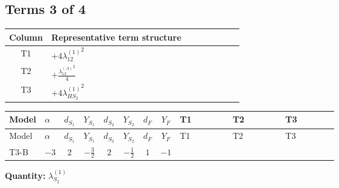 \documentclass[8pt]{article}
\begin{document}
\begin{landscape}
\subsection*{Terms 3 of 4}
\begin{center}
\begin{tabular}{@{}c >{\raggedright\arraybackslash}p{0.82\linewidth}@{}}
\toprule
Column & Representative term structure \\
\midrule
T1 & \(\displaystyle +4 {\lambda_{12}^{(1)}}^2\) \\
\midrule
T2 & \(\displaystyle +\frac{{\lambda_{12}^{(A)}}^2}{4}\) \\
\midrule
T3 & \(\displaystyle +4 {\lambda_{HS_2}^{(1)}}^2\) \\
\midrule
\bottomrule
\end{tabular}
\end{center}
\smallskip
\tiny
\begin{longtable}{@{}llcccccc >{\raggedright\arraybackslash}p{0.21\linewidth} >{\raggedright\arraybackslash}p{0.21\linewidth} >{\raggedright\arraybackslash}p{0.21\linewidth}@{}}
\toprule
Model & $\alpha$ & $d_{S_1}$ & $Y_{S_1}$ & $d_{S_2}$ & $Y_{S_2}$ & $d_F$ & $Y_F$ & T1 & T2 & T3 \\
\midrule
\endfirsthead
\toprule
Model & $\alpha$ & $d_{S_1}$ & $Y_{S_1}$ & $d_{S_2}$ & $Y_{S_2}$ & $d_F$ & $Y_F$ & T1 & T2 & T3 \\
\midrule
\endhead
T3-B & $-3$ & $2$ & $-\frac{3}{2}$ & $2$ & $-\frac{1}{2}$ & $1$ & $-1$ & \scriptsize\adjustbox{max width=\linewidth}{$\begin{gathered} +4 {\lambda_{12}^{(1)}}^2\end{gathered}$} & \scriptsize\adjustbox{max width=\linewidth}{$\begin{gathered} +\frac{{\lambda_{12}^{(A)}}^2}{4}\end{gathered}$} & \scriptsize\adjustbox{max width=\linewidth}{$\begin{gathered} +4 {\lambda_{HS_2}^{(1)}}^2\end{gathered}$} \\
\midrule
\bottomrule
\end{longtable}
\clearpage
\noindent\textbf{Quantity: }$\lambda_{S_2}^{(1)}$\par\smallskip

\end{landscape}
\end{document}
